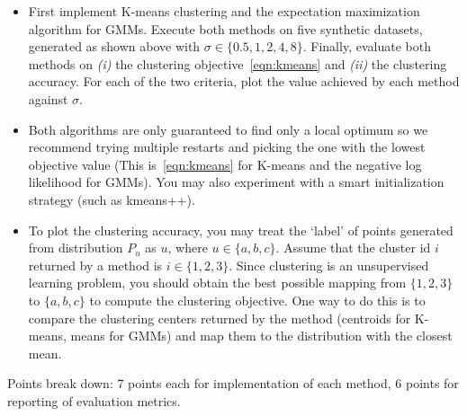 \begin{itemize}
\item First implement K-means clustering and the expectation maximization algorithm for GMMs.
Execute both methods on five synthetic datasets,
generated as shown above with $\sigma \in \{0.5, 1, 2, 4, 8\}$. Finally, evaluate both methods on \emph{(i)} the clustering objective~\eqref{eqn:kmeans} and \emph{(ii)}  the clustering accuracy. For each of the two criteria, plot the value achieved by each method against $\sigma$.

\item Both algorithms are only guaranteed to find only a local optimum so we recommend trying multiple
restarts and picking the one with the lowest objective value (This is~\eqref{eqn:kmeans} for K-means and the negative log likelihood for GMMs).
You may also experiment with a smart initialization
strategy (such as kmeans++).

\item
To plot the clustering accuracy,  you may treat the `label' of points generated from distribution
$P_u$ as $u$, where $u\in \{a, b, c\}$.
Assume that the cluster id $i$ returned by a method is $i\in \{1, 2, 3\}$.
Since clustering is an unsupervised learning problem, you should obtain the best possible mapping
from $\{1, 2, 3\}$ to $\{a, b, c\}$ to compute the clustering objective.
One way to do this is to compare the clustering centers returned by the method (centroids for
K-means, means for GMMs) and map them to the distribution with the closest mean.

\end{itemize}

Points break down: 7 points each for implementation of each method, 6 points for reporting of
evaluation metrics.
